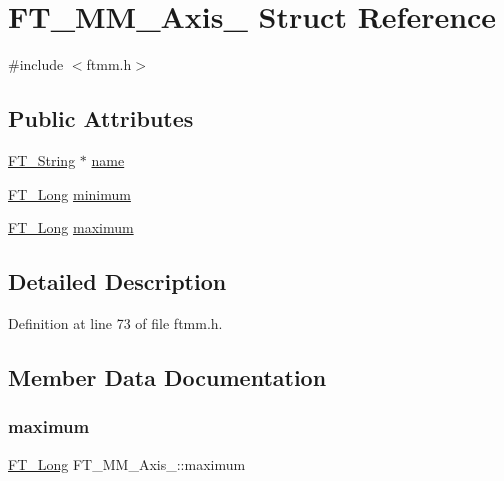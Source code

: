 \hypertarget{struct_f_t___m_m___axis__}{}\section{F\+T\+\_\+\+M\+M\+\_\+\+Axis\+\_\+ Struct Reference}
\label{struct_f_t___m_m___axis__}


{\ttfamily \#include $<$ftmm.\+h$>$}

\subsection*{Public Attributes}
\begin{DoxyCompactItemize}
\item 
\mbox{\hyperlink{fttypes_8h_a9846214585359eb2ba6bbb0e6de30639}{F\+T\+\_\+\+String}} $\ast$ \mbox{\hyperlink{struct_f_t___m_m___axis___a5c784efa44906c0e2b715eb1f866a09f}{name}}
\item 
\mbox{\hyperlink{fttypes_8h_a7fa72a1f0e79fb1860c5965789024d6f}{F\+T\+\_\+\+Long}} \mbox{\hyperlink{struct_f_t___m_m___axis___a9dc31f02b350b1356e0896673b5b73a4}{minimum}}
\item 
\mbox{\hyperlink{fttypes_8h_a7fa72a1f0e79fb1860c5965789024d6f}{F\+T\+\_\+\+Long}} \mbox{\hyperlink{struct_f_t___m_m___axis___addac1f8e71da1bedea9b393ae2751881}{maximum}}
\end{DoxyCompactItemize}


\subsection{Detailed Description}


Definition at line 73 of file ftmm.\+h.



\subsection{Member Data Documentation}
\mbox{\label{struct_f_t___m_m___axis___addac1f8e71da1bedea9b393ae2751881}} 
\subsubsection{\texorpdfstring{maximum}{maximum}}
{\footnotesize\ttfamily \mbox{\hyperlink{fttypes_8h_a7fa72a1f0e79fb1860c5965789024d6f}{F\+T\+\_\+\+Long}} F\+T\+\_\+\+M\+M\+\_\+\+Axis\+\_\+\+::maximum}



